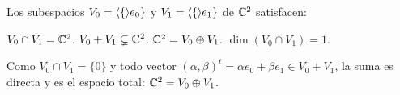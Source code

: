 \begin{questions}
  \question Los subespacios $V_0=\langle \{ \rangle e_0\}$ y $V_1=\langle \{ \rangle e_1\}$ de $\mathbb{C}^2$ satisfacen:

  \begin{choices}
    \choice $V_0\cap V_1 = \mathbb{C}^2$.
    \choice $V_0 + V_1 \subsetneq \mathbb{C}^2$.
    \CorrectChoice $\mathbb{C}^2 = V_0\oplus V_1$.
    \choice $\dim(V_0\cap V_1) = 1$.
  \end{choices}
  \begin{solution}
    Como $V_0\cap V_1=\{0\}$ y todo vector $(\alpha,\beta)^t=\alpha e_0+\beta e_1\in V_0+V_1$, la suma es directa y es el espacio total: $\mathbb{C}^2=V_0\oplus V_1$.
  \end{solution}

\end{questions}
